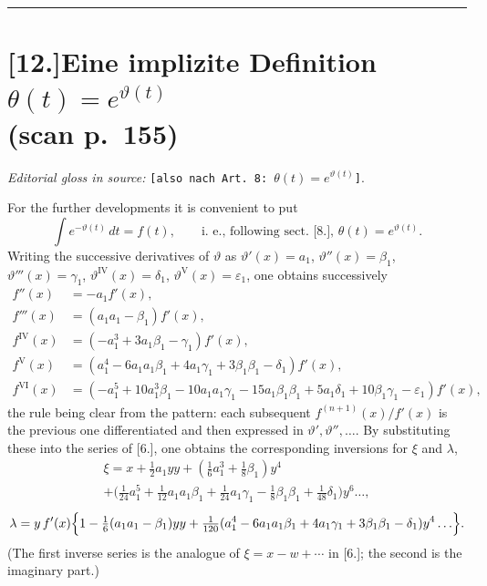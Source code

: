 \documentclass[12pt,a4paper]{article}
\begin{document}
\bigskip
\hrule
\bigskip

\section*{[12.]\quad Eine implizite Definition $\theta(t)=e^{\vartheta(t)}$\\(scan p.~155)}

\textit{Editorial gloss in source:} \texttt{[also nach Art.\ 8:
$\theta(t)=e^{\vartheta(t)}$]}.

For the further developments it is convenient to put
\[
   \int e^{-\vartheta(t)}\,dt = f(t),
   \qquad \text{i.\ e.,\ following sect.~[8.],\ } \theta(t) = e^{\vartheta(t)}.
\]
Writing the successive derivatives of $\vartheta$ as
$\vartheta'(x)=a_{1}$, $\vartheta''(x)=\beta_{1}$, $\vartheta'''(x)=\gamma_{1}$,
$\vartheta^{\mathrm{IV}}(x)=\delta_{1}$, $\vartheta^{\mathrm{V}}(x)=\varepsilon_{1}$,
one obtains successively
\begin{align*}
   f''(x) &= -a_{1}f'(x),\\
   f'''(x) &= (a_{1}a_{1}-\beta_{1})f'(x),\\
   f^{\mathrm{IV}}(x) &= (-a_{1}^{3}+3a_{1}\beta_{1}-\gamma_{1})f'(x),\\
   f^{\mathrm{V}}(x) &= (a_{1}^{4}-6a_{1}a_{1}\beta_{1}+4a_{1}\gamma_{1}
                      +3\beta_{1}\beta_{1}-\delta_{1})f'(x),\\
   f^{\mathrm{VI}}(x) &= (-a_{1}^{5}+10a_{1}^{3}\beta_{1}
                      -10a_{1}a_{1}\gamma_{1}-15a_{1}\beta_{1}\beta_{1}
                      +5a_{1}\delta_{1}+10\beta_{1}\gamma_{1}
                      -\varepsilon_{1})f'(x),
\end{align*}
the rule being clear from the pattern: each subsequent
$f^{(n+1)}(x)/f'(x)$ is the previous one differentiated and then
expressed in $\vartheta',\vartheta'',\ldots$. By substituting these
into the series of [6.], one obtains the corresponding inversions for
$\xi$ and $\lambda$,
\begin{multline*}
   \xi = x + \tfrac{1}{2}a_{1}yy + (\tfrac{1}{6}a_{1}^{3}+\tfrac{1}{8}\beta_{1})y^{4}\\
      + \bigl(\tfrac{1}{24}a_{1}^{5}+\tfrac{1}{12}a_{1}a_{1}\beta_{1}+\tfrac{1}{24}a_{1}\gamma_{1}
              -\tfrac{1}{8}\beta_{1}\beta_{1}+\tfrac{1}{48}\delta_{1}\bigr)y^{6}\ldots,
\end{multline*}
\[
   \lambda = y\,f'(x)\Bigl\{1-\tfrac{1}{6}(a_{1}a_{1}-\beta_{1})yy
       + \tfrac{1}{120}(a_{1}^{4}-6a_{1}a_{1}\beta_{1}+4a_{1}\gamma_{1}
                      +3\beta_{1}\beta_{1}-\delta_{1})y^{4}\ldots\Bigr\}.
\]
(The first inverse series is the analogue of $\xi=x-w+\cdots$ in
[6.]; the second is the imaginary part.)
\end{document}
